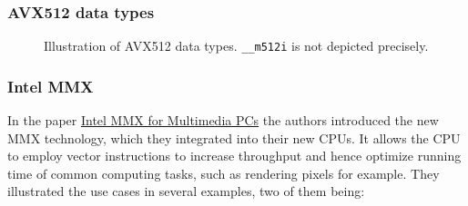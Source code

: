 \documentclass[../../main.tex]{subfiles}
\begin{document}
\newpage
\subsubsection{AVX512 data types}
\begin{figure}[h]
\caption{Illustration of AVX512 data types. \texttt{\_\_m512i} is not depicted precisely.}
\end{figure}

\bigskip
\subsubsection{Intel MMX}
In the paper \href{https://dl.acm.org/doi/pdf/10.1145/242857.242865}{Intel MMX for Multimedia PCs} the authors introduced the new MMX technology, which they integrated into their new CPUs. It allows the CPU to employ vector instructions to increase throughput and hence optimize running time of common computing tasks, such as rendering pixels for example. They illustrated the use cases in several examples, two of them being:
\end{document}
